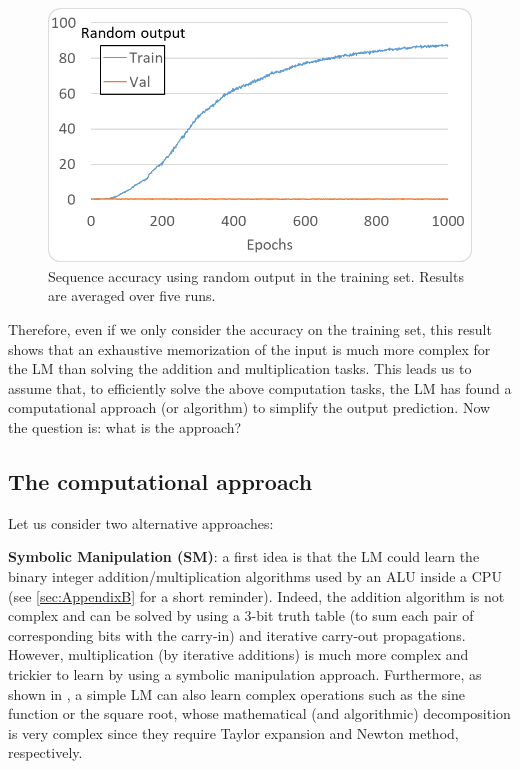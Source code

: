 \documentclass[final,1p,times,authoryear]{elsarticle}
\begin{document}
\begin{figure}[h]
\begin{center}
\includegraphics[scale=1.05]{RandomSeqAccuracies}
\end{center}
\caption{Sequence accuracy using random output in the training set. Results are averaged over five runs.}
\label{figure:RandSeqAccuracies}
\end{figure}

Therefore, even if we only consider the accuracy on the training set, this result shows that an exhaustive memorization of the input is much more complex for the LM than solving the addition and multiplication tasks. This leads us to assume that, to efficiently solve the above computation tasks, the LM has found a computational approach (or algorithm) to simplify the output prediction. Now the question is: what is the approach? 

\subsection{The computational approach} \label{subsec:ComputationalApproach}

Let us consider two alternative approaches:

\textbf{Symbolic Manipulation (SM)}: a first idea is that the LM could learn the binary integer addition/multiplication algorithms used by an ALU inside a CPU (see \ref{sec:AppendixB} for a short reminder). Indeed, the addition algorithm is not complex and can be solved by using a 3-bit truth table (to sum each pair of corresponding bits with the carry-in) and iterative carry-out propagations. However, multiplication (by iterative additions) is much more complex and trickier to learn by using a symbolic manipulation approach. Furthermore, as shown in \citet{Lee2023}, a simple LM can also learn complex operations such as the sine function or the square root, whose mathematical (and algorithmic) decomposition is very complex since they require Taylor expansion and Newton method, respectively.
\end{document}
